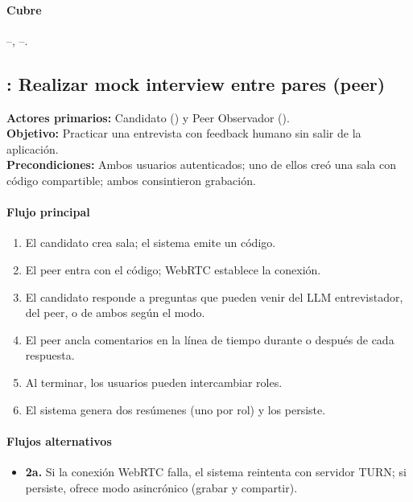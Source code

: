 \paragraph{Cubre} --, --.

\subsection{: Realizar mock interview entre pares (peer)}
\begin{cajaCriterio}
\textbf{Actores primarios:} Candidato () y Peer Observador (). \\
\textbf{Objetivo:} Practicar una entrevista con feedback humano sin
salir de la aplicación. \\
\textbf{Precondiciones:} Ambos usuarios autenticados; uno de ellos creó
una sala con código compartible; ambos consintieron grabación.
\end{cajaCriterio}

\paragraph{Flujo principal}
\begin{enumerate}
  \item El candidato crea sala; el sistema emite un código.
  \item El peer entra con el código; WebRTC establece la conexión.
  \item El candidato responde a preguntas que pueden venir del LLM
        entrevistador, del peer, o de ambos según el modo.
  \item El peer ancla comentarios en la línea de tiempo durante o
        después de cada respuesta.
  \item Al terminar, los usuarios pueden intercambiar roles.
  \item El sistema genera dos resúmenes (uno por rol) y los persiste.
\end{enumerate}

\paragraph{Flujos alternativos}
\begin{itemize}
  \item \textbf{2a.} Si la conexión WebRTC falla, el sistema reintenta
        con servidor TURN; si persiste, ofrece modo asincrónico
        (grabar y compartir).
\end{itemize}

